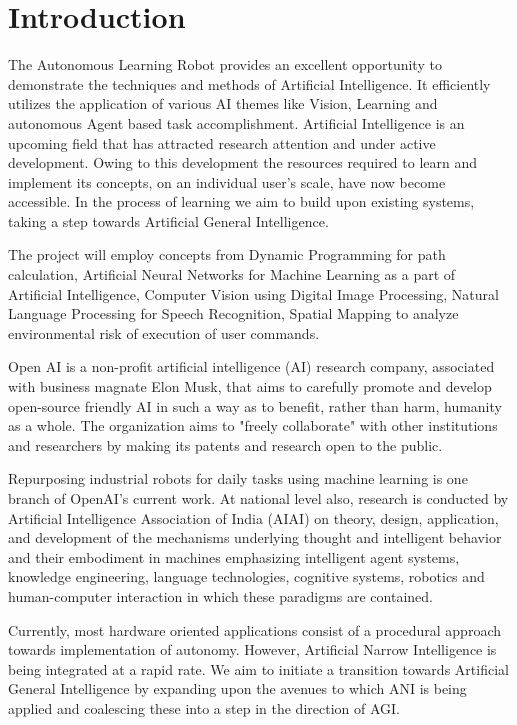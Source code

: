 \section{Introduction} \label{sec:introduction}

The Autonomous Learning Robot provides an excellent opportunity to demonstrate the techniques and methods of Artificial Intelligence. It efficiently utilizes the application of various AI themes like Vision, Learning and autonomous Agent based task accomplishment. Artificial Intelligence is an upcoming field that has attracted research attention and under active development. Owing to this development the resources required to learn and implement its concepts, on an individual user’s scale, have now become accessible. In the process of learning we aim to build upon existing systems, taking a step towards Artificial General Intelligence.

The project will employ concepts from Dynamic Programming for path calculation, Artificial Neural Networks for Machine Learning as a part of Artificial Intelligence, Computer Vision using Digital Image Processing, Natural Language Processing for Speech Recognition, Spatial Mapping to analyze environmental risk of execution of user commands.

Open AI is a non-profit artificial intelligence (AI) research company, associated with business magnate Elon Musk, that aims to carefully promote and develop open-source friendly AI in such a way as to benefit, rather than harm, humanity as a whole. The organization aims to "freely collaborate" with other institutions and researchers by making its patents and research open to the public.

Repurposing industrial robots for daily tasks using machine learning is one branch of OpenAI’s current work. At national level also, research is conducted by Artificial Intelligence Association of India (AIAI) on theory, design, application, and development of the mechanisms underlying thought and intelligent behavior and their embodiment in machines emphasizing intelligent agent systems, knowledge engineering, language technologies, cognitive systems, robotics and human-computer interaction in which these paradigms are contained.

Currently, most hardware oriented applications consist of a procedural approach towards implementation of autonomy. However, Artificial Narrow Intelligence is being integrated at a rapid rate. We aim to initiate a transition towards Artificial General Intelligence by expanding upon the avenues to which ANI is being applied and coalescing these into a step in the direction of AGI. 



